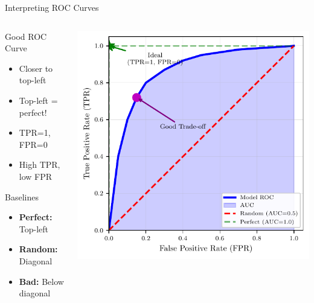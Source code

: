 \documentclass{beamer}
\begin{document}
\begin{frame}{Interpreting ROC Curves}
\begin{columns}
\begin{column}{0.48\textwidth}
\begin{keypointsbox}{Good ROC Curve}
\small
\begin{itemize}
    \item Closer to top-left
    \item Top-left = perfect!
    \item TPR=1, FPR=0
    \item High TPR, low FPR
\end{itemize}
\end{keypointsbox}

\begin{block}{Baselines}
\footnotesize
\begin{itemize}
    \item \textbf{Perfect:} Top-left
    \item \textbf{Random:} Diagonal
    \item \textbf{Bad:} Below diagonal
\end{itemize}
\end{block}
\end{column}
\begin{column}{0.48\textwidth}
\includegraphics[width=\textwidth]{roc-curve-diagram.pdf}
\end{column}
\end{columns}
\end{frame}
\end{document}
